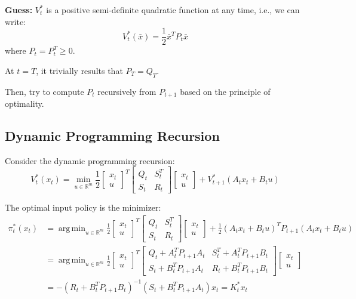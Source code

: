\documentclass[openany]{book}
\DeclareMathOperator*{\argmin}{arg\,min}  %
\theoremstyle{definition}
\theoremstyle{remark}
\begin{document}
\noindent\textbf{Guess:} $V_t^*$ is a positive semi-definite quadratic function at any time, i.e., we can write:
\[
V_t^*(\bar{x}) = \frac{1}{2}\bar{x}^T P_t\bar{x}
\]
where $P_t = P_t^T \geq 0$.

At $t=T$, it trivially results that $P_T = Q_T$.

Then, try to compute $P_t$ recursively from $P_{t+1}$ based on the principle of optimality.

\subsection{Dynamic Programming Recursion}
Consider the dynamic programming recursion:
\[
V_t^*(x_t) = \min_{u\in\mathbb{R}^m} \frac{1}{2}\begin{bmatrix}
x_t \\ u
\end{bmatrix}^T \begin{bmatrix}
Q_t & S_t^T \\ S_t & R_t
\end{bmatrix} \begin{bmatrix}
x_t \\ u
\end{bmatrix} + V_{t+1}^*(A_tx_t + B_tu)
\]

The optimal input policy is the minimizer:
\begin{align*}
\pi_t^*(x_t) &= \argmin_{u\in\mathbb{R}^m} \frac{1}{2}\begin{bmatrix}
x_t \\ u
\end{bmatrix}^T \begin{bmatrix}
Q_t & S_t^T \\ S_t & R_t
\end{bmatrix} \begin{bmatrix}
x_t \\ u
\end{bmatrix} + \frac{1}{2}(A_tx_t + B_tu)^T P_{t+1}(A_tx_t + B_tu)\\
&= \argmin_{u\in\mathbb{R}^m} \frac{1}{2}\begin{bmatrix}
x_t \\ u
\end{bmatrix}^T \begin{bmatrix}
Q_t + A_t^T P_{t+1} A_t & S_t^T + A_t^T P_{t+1} B_t\\
S_t + B_t^T P_{t+1} A_t & R_t + B_t^T P_{t+1} B_t
\end{bmatrix} \begin{bmatrix}
x_t \\ u
\end{bmatrix}\\
&= -(R_t + B_t^T P_{t+1} B_t)^{-1}(S_t + B_t^T P_{t+1} A_t)x_t = K_t^*x_t
\end{align*}
\end{document}
